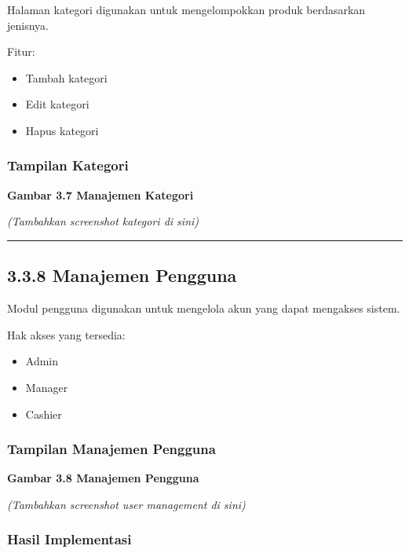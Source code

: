 Halaman kategori digunakan untuk mengelompokkan produk berdasarkan jenisnya.

Fitur:

\begin{itemize}
\tightlist
\item
  Tambah kategori
\item
  Edit kategori
\item
  Hapus kategori
\end{itemize}

\subsubsection{Tampilan Kategori}\label{tampilan-kategori}

\textbf{Gambar 3.7 Manajemen Kategori}

\emph{(Tambahkan screenshot kategori di sini)}

\begin{center}\rule{0.5\linewidth}{0.5pt}\end{center}

\subsection{3.3.8 Manajemen Pengguna}\label{manajemen-pengguna-1}

Modul pengguna digunakan untuk mengelola akun yang dapat mengakses sistem.

Hak akses yang tersedia:

\begin{itemize}
\tightlist
\item
  Admin
\item
  Manager
\item
  Cashier
\end{itemize}

\subsubsection{Tampilan Manajemen Pengguna}\label{tampilan-manajemen-pengguna}

\textbf{Gambar 3.8 Manajemen Pengguna}

\emph{(Tambahkan screenshot user management di sini)}

\subsubsection{Hasil Implementasi}\label{hasil-implementasi-5}

